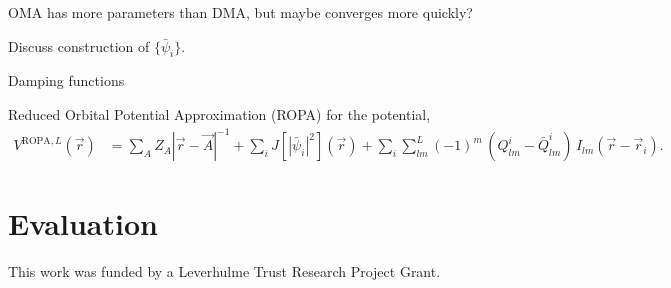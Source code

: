\documentclass[journal=jacsat,manuscript=article]{achemso}
\begin{document}
OMA has more parameters than DMA, but maybe converges more quickly?

Discuss construction of $\{\bar\psi_i\}$.

Damping functions\cite{Koide1981a,Tang1984AnCoefficients,Knowles1986,Knowles1986a,Knowles1987a}

Reduced Orbital Potential Approximation (ROPA) for the potential,
\begin{align}
    V^{\text{ROPA},L}(\vec r) &=
    \sum_A Z_A |\vec r
    - \vec A|^{-1}
    +\sum_i J\left[\left|\bar\psi_i\right|^2\right](\vec r)
    +\sum_i \sum_{lm}^L (-1)^m\,\left(Q^i_{lm}-\bar Q^i_{lm}\right)\, I_{lm}(\vec r - \vec r_i)
    .
\end{align}
\section{Evaluation}

\begin{acknowledgement}

This work was funded by a Leverhulme Trust Research Project Grant.

\end{acknowledgement}

\begin{suppinfo}


\end{suppinfo}


\end{document}
